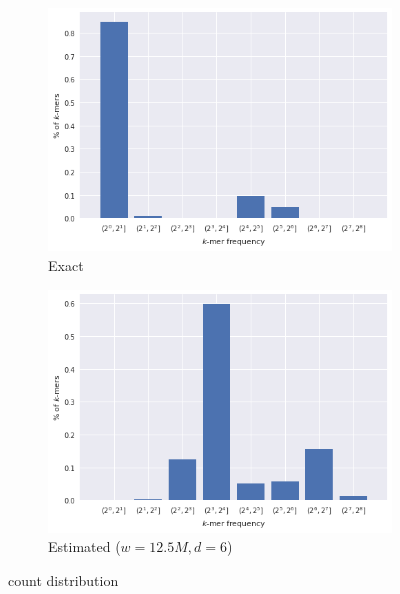 \begin{figure}[htb]
    \centering
    \begin{subfigure}{.5\textwidth}
        \centering
        \includegraphics[width=\textwidth]{figures/e_coli-kmer_frequencies-exact-K31}
        \caption{Exact}\label{fig:ecoli-art-dbcm-counts-exact}
    \end{subfigure}%
    \begin{subfigure}{.5\textwidth}
        \centering
        \includegraphics[width=\textwidth]{figures/e_coli-kmer_frequencies-estimated-K31-W10000000-D6}
        \caption{Estimated ($w = 12.5M, d = 6$)}\label{fig:ecoli-art-dbcm-counts-exact}
    \end{subfigure}
	\caption{\kmer count distribution}\label{fig:ecoli-art-dbcm-counts}
\end{figure}

